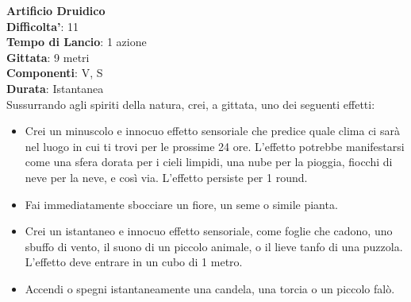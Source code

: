 \begin{multicols}{2}
\medskip\textbf{Artificio Druidico}\\
\textbf{Difficolta'}: 11\\
\textbf{Tempo di Lancio}: 1 azione\\
\textbf{Gittata}: 9 metri\\
\textbf{Componenti}: V, S\\
\textbf{Durata}: Istantanea\\
Sussurrando agli spiriti della natura, crei, a gittata, uno dei seguenti effetti:
\begin{itemize}
\item
Crei un minuscolo e innocuo effetto sensoriale che predice quale clima ci sarà nel luogo in cui ti trovi per le prossime 24 ore. L’effetto potrebbe manifestarsi come una sfera dorata per i cieli limpidi, una nube per la pioggia, fiocchi di neve per la neve, e così via. L’effetto persiste per 1 round.
\item 
Fai immediatamente sbocciare un fiore, un seme o simile pianta.
\item 
Crei un istantaneo e innocuo effetto sensoriale, come foglie che cadono, uno sbuffo di vento, il suono di un piccolo animale, o il lieve tanfo di una puzzola. L’effetto deve entrare in un cubo di 1 metro.
\item Accendi o spegni istantaneamente una candela, una torcia o un piccolo falò.
\end{itemize}


\end{multicols}
